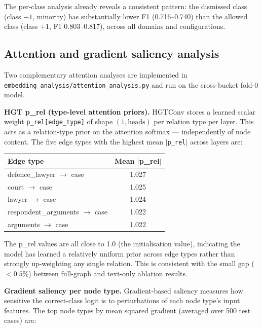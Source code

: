 \documentclass[12pt,a4paper]{article}
\begin{document}
The per-class analysis already reveals a consistent pattern: the dismissed class (class $-1$, minority) has substantially lower F1 (0.716--0.740) than the allowed class (class $+1$, F1 0.803--0.817), across all domains and configurations.

\subsection{Attention and gradient saliency analysis}

Two complementary attention analyses are implemented in \texttt{embedding\_analysis/attention\_analysis.py} and run on the cross-bucket fold-0 model.

\textbf{HGT p\_rel (type-level attention priors).}
HGTConv stores a learned scalar weight \texttt{p\_rel[edge\_type]} of shape $(1, \text{heads})$ per relation type per layer. This acts as a relation-type prior on the attention softmax — independently of node content. The five edge types with the highest mean $|$\texttt{p\_rel}$|$ across layers are:

\begin{center}
\begin{tabular}{lc}
\toprule
\textbf{Edge type} & \textbf{Mean $|$p\_rel$|$} \\
\midrule
defence\_lawyer $\to$ case & 1.027 \\
court $\to$ case           & 1.025 \\
lawyer $\to$ case          & 1.024 \\
respondent\_arguments $\to$ case & 1.022 \\
arguments $\to$ case       & 1.022 \\
\bottomrule
\end{tabular}
\end{center}

The p\_rel values are all close to 1.0 (the initialisation value), indicating the model has learned a relatively uniform prior across edge types rather than strongly up-weighting any single relation. This is consistent with the small gap ($<0.5\%$) between full-graph and text-only ablation results.

\textbf{Gradient saliency per node type.}
Gradient-based saliency measures how sensitive the correct-class logit is to perturbations of each node type's input features. The top node types by mean squared gradient (averaged over 500 test cases) are:
\end{document}
